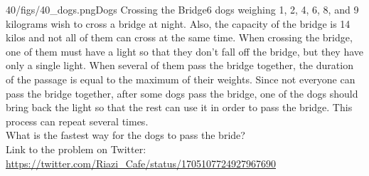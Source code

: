 \begin{problem}{40/figs/40_dogs.png}{Dogs Crossing the Bridge}6 dogs weighing 1, 2, 4, 6, 8, and 9 kilograms wish to cross a bridge at night. Also, the capacity of the bridge is 14 kilos and not all of them can cross at the same time. When crossing the bridge, one of them must have a light so that they don't fall off the bridge, but they have only a single light. When several of them pass the bridge together, the duration of the passage is equal to the maximum of their weights. Since not everyone can pass the bridge together, after some  dogs pass the bridge, one of the dogs should bring back the light so that the rest can use it in order to pass the bridge. This process can repeat several times.\\[0.2cm]

What is the fastest way for the dogs to pass the bride?\\[0.2cm]

Link to the problem on Twitter:  \url{https://twitter.com/Riazi_Cafe/status/1705107724927967690}\end{problem}